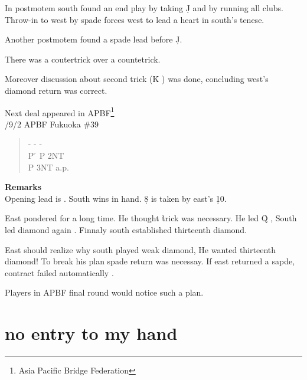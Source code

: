 In postmotem south found an end play by taking \d J  and by 
running  all clubs. Throw-in to west by spade forces west to lead a
heart in south's tenese.

Another postmotem found a spade lead before \d J.

There was a coutertrick over a countetrick.

Moreover discussion about second trick (\h K ) was done,
concluding 
west's diamond return was correct. 
\vspace{0.5cm}

Next deal appeared in APBF\footnote{
Asia Pacific Bridge Federation
}\\
/9/2 APBF Fukuoka \#39
\begin{quote}
%
  {}%
  {}
  {}%
  {}%
\end{quote}
\begin{quote}
\begin{bidding}
- \> -  \> - \c  \\
P \h \> P \> 2NT\\
P \> 3NT \> a.p.
\end{bidding}
\end{quote}
{\bf Remarks}\\

Opening lead is . South wins in hand. \d 8 is taken by
east's \d 10.

East pondered for a long time. He thought  \h trick was 
necessary. He led \h Q ,  South led diamond again .
Finnaly south established thirteenth diamond.

East should realize why south played weak diamond, He wanted 
thirteenth diamond! To break his plan spade return was necessay.
If east returned a sapde, contract failed automatically .

Players in APBF final round would notice such a plan.

\section{no entry to my hand}

